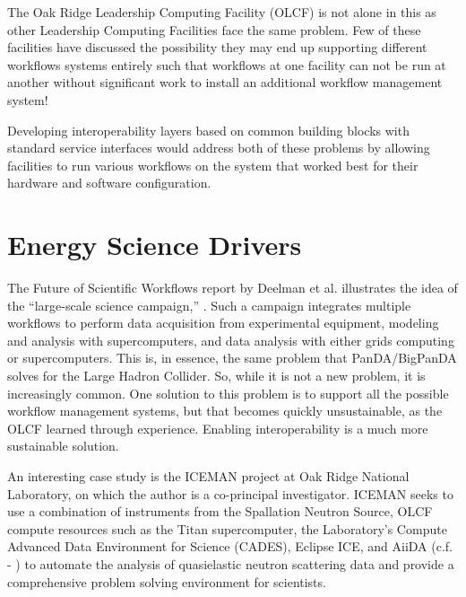 The Oak Ridge Leadership Computing Facility (OLCF) is not alone in this
as other Leadership Computing Facilities face the same problem. Few
of these facilities have discussed the possibility they may end up
supporting different workflows systems entirely such that workflows at
one facility can not be run at another without significant work to
install an additional workflow management system!

Developing interoperability layers based on common building blocks with
standard service interfaces would address both of these problems by
allowing facilities to run various workflows on the system that worked
best for their hardware and software configuration.

\section{Energy Science Drivers}\label{energy-science-drivers}

The Future of Scientific Workflows report by Deelman et al. illustrates
the idea of the ``large-scale science campaign,'' \cite{deelman_future_2015}.
Such a campaign integrates multiple workflows to perform data
acquisition from experimental equipment, modeling and analysis with
supercomputers, and data analysis with either grids computing or
supercomputers. This is, in essence, the same problem that
PanDA/BigPanDA solves for the Large Hadron Collider. So, while it is not
a new problem, it is increasingly common. One solution to this problem
is to support all the possible workflow management systems, but that
becomes quickly unsustainable, as the OLCF learned through experience.
Enabling interoperability is a much more sustainable solution.

An interesting case study is the ICEMAN project at Oak Ridge National
Laboratory, on which the author is a co-principal investigator. ICEMAN
seeks to use a combination of instruments from the Spallation Neutron
Source, OLCF compute resources such as the Titan supercomputer, the
Laboratory's Compute Advanced Data Environment for Science (CADES),
Eclipse ICE, and AiiDA (c.f. - \cite{pizzi_aiida:_2016}) to automate the
analysis of quasielastic neutron scattering data and provide a
comprehensive problem solving environment for scientists.
